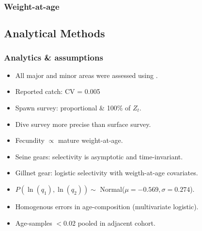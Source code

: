 \begin{frame}[t]\frametitle{Weight-at-age}
\end{frame}
%

\subsection{Analytical Methods} %
\label{sub:analytical_methods}
\begin{frame}[t]\frametitle{Analytics \& assumptions}
	\begin{itemize}
		\item<+-> All major and minor areas were assessed using  \iscam.
		\item<+-> Reported catch: CV = 0.005
		\item<+-> Spawn survey: proportional \& 100\% of $Z_t$.
		\item<+-> Dive survey more precise than surface survey.
		\item<+-> Fecundity $\propto$ mature weight-at-age.
		\item<+-> Seine gears: selectivity is asymptotic and time-invariant. 
		\item<+-|alert@+> Gillnet gear: logistic selectivity with weigth-at-age covariates.
		\item<+-|alert@+> $P(\ln(q_1),\ln(q_2)) \sim $ Normal($\mu=-0.569,\sigma=0.274$).
		\item<+-> Homogenous errors in age-composition (multivariate logistic).
		\item<+-> Age-samples $<$0.02 pooled in adjacent cohort.
	\end{itemize}
\end{frame}

